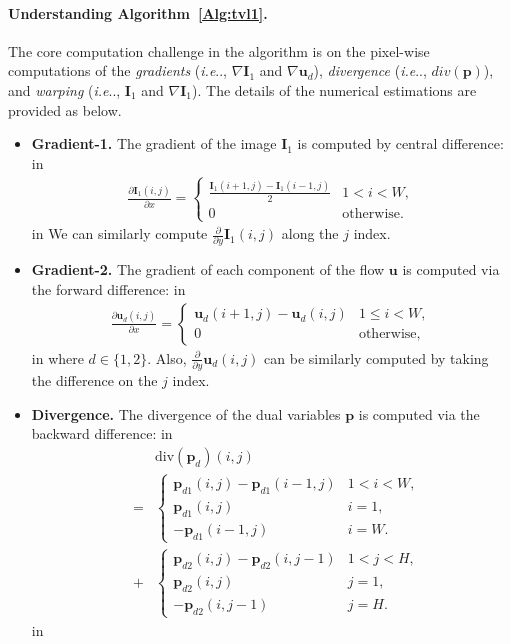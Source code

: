 \documentclass[10pt,twocolumn,letterpaper]{article}
\makeatletter
\DeclareRobustCommand\onedot{\futurelet\@let@token\@onedot}
\def\@onedot{\ifx\@let@token.\else.\null\fi\xspace}
\def\ie{\emph{i.e}\onedot} \def\Ie{\emph{I.e}\onedot}
\def\Vec#1{{\boldsymbol{#1}}}
\def\Mat#1{{\boldsymbol{#1}}}
\makeatother
\begin{document}
\paragraph{Understanding Algorithm~\ref{Alg:tvl1}.} The core computation challenge in the algorithm is on the pixel-wise computations of  the \emph{gradients} (\ie, $\nabla\Mat{I}_1$ and $\nabla\Vec{u}_d$), \emph{divergence} (\ie, $div(\Vec{p})$), and \emph{warping} (\ie, $\Mat{I}_1$ and $\nabla\Mat{I}_1$).
The details of the numerical estimations are provided as below.
\begin{itemize}
  \item \textbf{Gradient-1.} The gradient of the image $\Mat{I}_1$ is computed by central difference:
   in
  \begin{eqnarray}
  \label{Eq:central}
  \frac{\partial \Mat{I}_1(i,j)}{\partial x} = \left\{
   \begin{array}{ll}
   \frac{\Mat{I}_1(i+1,j)-\Mat{I}_1(i-1,j)}{2} & 1<i<W,\\
   0 & \text{otherwise}.
   \end{array}
   \right.
  \end{eqnarray}
   in \noindent
  We can similarly compute $\frac{\partial}{\partial y} \Mat{I}_1(i,j)$ along the $j$ index.
  \item \textbf{Gradient-2.} The gradient of each component of the flow $\Mat{u}$ is computed via the forward difference:
   in
  \begin{eqnarray}
  \label{Eq:forward}
  \frac{\partial \Vec{u}_d(i,j)}{\partial x} = \left\{
   \begin{array}{ll}
   \Vec{u}_d(i+1,j)-\Vec{u}_d(i,j) & 1\leq i<W,\\
   0 & \text{otherwise},
   \end{array}
   \right.
  \end{eqnarray}
   in \noindent
  where $d\in\{1,2\}$. Also, $\frac{\partial}{\partial y} \Mat{u}_d(i,j)$ can be similarly computed by taking the difference on the $j$ index.
  \item \textbf{Divergence.} The divergence of the dual variables $\Vec{p}$ is computed via the backward difference:
   in
  \begin{eqnarray}
  \label{Eq:backward}
   \nonumber
   && \mathrm{div}(\Vec{p}_d)(i,j) \\
   \nonumber
   &=& \left\{
   \begin{array}{ll}
   \Vec{p}_{d1}(i,j)-\Vec{p}_{d1}(i-1,j) & 1< i <W,\\
   \Vec{p}_{d1}(i,j)  & i=1,\\
   -\Vec{p}_{d1}(i-1,j)  & i=W.
   \end{array}
   \right.\\
   &+&
   \left\{
   \begin{array}{ll}
   \Vec{p}_{d2}(i,j)-\Vec{p}_{d2}(i,j-1) & 1< j <H,\\
   \Vec{p}_{d2}(i,j)  & j=1,\\
   -\Vec{p}_{d2}(i,j-1)  & j=H.
   \end{array}
   \right.
  \end{eqnarray}
   in \noindent
\end{itemize}
\end{document}
